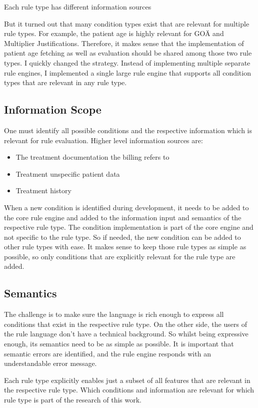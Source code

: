Each rule type has different information sources

But it turned out that many condition types exist that are relevant for multiple rule types.
For example, the patient age is highly relevant for GOÄ and Multiplier Justifications.
Therefore, it makes sense that the implementation of patient age fetching as well as evaluation should be shared among those two rule types.
I quickly changed the strategy.
Instead of implementing multiple separate rule engines,
I implemented a single large rule engine that supports all condition types that are relevant in any rule type.


\subsection{Information Scope}
One must identify all possible conditions and the respective information which is relevant for rule evaluation.
Higher level information sources are:
\begin{itemize}
    \item The treatment documentation the billing refers to
    \item Treatment unspecific patient data
    \item Treatment history
\end{itemize}
When a new condition is identified during development,
it needs to be added to the core rule engine
and added to the information input and semantics of the respective rule type.
The condition implementation is part of the core engine and not specific to the rule type.
So if needed, the new condition can be added to other rule types with ease.
It makes sense to keep those rule types as simple as possible,
so only conditions that are explicitly relevant for the rule type are added.

\subsection{Semantics}
The challenge is to make sure the language is rich enough
to express all conditions that exist in the respective rule type.
On the other side, the users of the rule language don't have a technical background.
So whilst being expressive enough, its semantics need to be as simple as possible.
It is important that semantic errors are identified, and the rule engine responds with an understandable error message.

Each rule type explicitly enables just a subset of all features that are relevant in the respective rule type.
Which conditions and information are relevant for which rule type is part of the research of this work.

